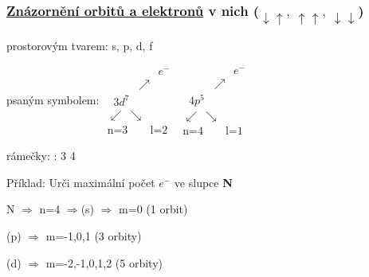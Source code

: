 \subsubsection[Znázornění orbitů a elektronů]{\underline{Znázornění orbitů a elektronů} v nich ($\downarrow \uparrow,~ \uparrow \uparrow,~ \downarrow\downarrow$)}
\begin{description}
    \TabPositions{0em, 12em}
    \vspace{1em}
    \item[a)] prostorovým tvarem: \tab s, p, d, f
    \vspace{2em}
    \item[b)] psaným symbolem: \tab \(
        \begin{array}{c}
            \qquad\qquad\;\; e^-\\
            \qquad \;\;\; \nearrow \\
            \;\;3d^7 \\
            \swarrow~\searrow \\
            \mbox{n=3} \qquad \mbox{l=2}
        \end{array}
    \)
    \hspace{6em}
    \(
        \begin{array}{c}
            \qquad\qquad\;\; e^-\\
            \qquad \;\;\; \nearrow \\
            \;\;4p^5 \\
            \swarrow~\searrow \\
            \mbox{n=4} \qquad \mbox{l=1}
        \end{array}
    \)
    \vspace{2em}
    \item[c)] rámečky: \tab  : 3 \fbox{$\downarrow\uparrow$}\fbox{$\downarrow\uparrow$}\fbox{$\downarrow$ }\fbox{$\downarrow$ }\fbox{$\downarrow$ } \hspace{3em} 4 \fbox{$\downarrow\uparrow$}\fbox{$\downarrow\uparrow$}\fbox{$\downarrow$ }
\end{description}

\newpage
{}
Příklad: Urči maximální počet $e^-$ ve slupce \textbf{N}

\smallskip
\TabPositions{0em, 7em}
N $\Rightarrow$ n=4 $\Rightarrow$(s) $\Rightarrow$ m=0 (1 orbit)

    (p) $\Rightarrow$ m=-1,0,1 (3 orbity)

    (d) $\Rightarrow$ m=-2,-1,0,1,2 (5 orbity)

